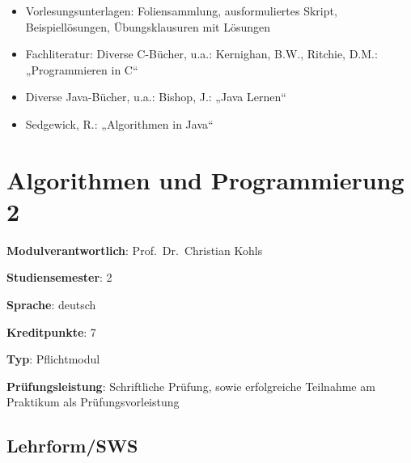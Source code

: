 \begin{itemize}
\tightlist
\item
  Vorlesungsunterlagen: Foliensammlung, ausformuliertes Skript,
  Beispiellösungen, Übungsklausuren mit Lösungen
\item
  Fachliteratur: Diverse C-Bücher, u.a.: Kernighan, B.W., Ritchie, D.M.:
  „Programmieren in C``
\item
  Diverse Java-Bücher, u.a.: Bishop, J.: „Java Lernen``
\item
  Sedgewick, R.: „Algorithmen in Java``
\end{itemize}

\hypertarget{algorithmen-und-programmierung-2pathlabelmi-2017modulbeschreibungen-bachelorba_algorithmenundprogrammierung2}{%
\chapter{Algorithmen und Programmierung
2\label{/mi-2017/modulbeschreibungen-bachelor/BA_AlgorithmenundProgrammierung2}}\label{algorithmen-und-programmierung-2pathlabelmi-2017modulbeschreibungen-bachelorba_algorithmenundprogrammierung2}}

\begin{modulHead}
\textbf{Modulverantwortlich}: Prof.~Dr.~Christian
Kohls
\end{modulHead}
\begin{modulHead}
\textbf{Studiensemester}:
2
\end{modulHead}
\begin{modulHead}
\textbf{Sprache}:
deutsch
\end{modulHead}
\begin{modulHead}
\textbf{Kreditpunkte}:
7
\end{modulHead}
\begin{modulHead}
\textbf{Typ}:
Pflichtmodul
\end{modulHead}
\begin{modulHead}
\textbf{Prüfungsleistung}:
Schriftliche Prüfung, sowie erfolgreiche Teilnahme am Praktikum als
Prüfungsvorleistung
\end{modulHead}


\hypertarget{lehrformswspathlabelmi-2017modulbeschreibungen-bachelorba_algorithmenundprogrammierung2}{%
\section*{Lehrform/SWS\label{/mi-2017/modulbeschreibungen-bachelor/BA_AlgorithmenundProgrammierung2}}\label{lehrformswspathlabelmi-2017modulbeschreibungen-bachelorba_algorithmenundprogrammierung2}}

